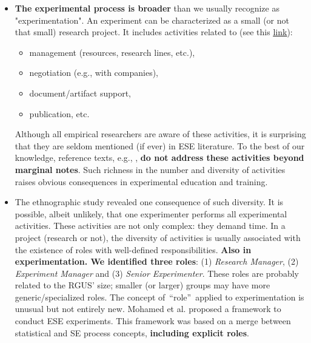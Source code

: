 \begin{itemize}
	\item \textbf{The experimental process is broader} than we usually recognize as "experimentation". An experiment can be characterized as a small (or not that small) research project. It includes activities related to (see this \href{https://zenodo.org/record/7105096#.YyxsxezMLUJ}{\ul{link}}):
	\begin{itemize}
		\item management (resources, research lines, etc.),
		\item negotiation (e.g., with companies), 
		\item document/artifact support, 
		\item publication, etc.
	\end{itemize}
Although all empirical researchers are aware of these activities, it is surprising that they are seldom mentioned (if ever) in ESE literature. To the best of our knowledge, reference texts, e.g., \cite{Wohlin-2000-Experimentation-SE}, \cite{Juristo-2001-SE-experimentation} \textbf{do not address these activities beyond marginal notes}. Such richness in the number and diversity of activities raises obvious consequences in experimental education and training.
	\item The ethnographic study revealed one consequence of such diversity. It is possible, albeit unlikely, that one experimenter performs all experimental activities. These activities are not only complex: they demand time. In a project (research or not), the diversity of activities is usually associated with the existence of roles with well-defined responsibilities. \textbf{Also in experimentation. We identified three roles}: (1) \textit{Research Manager}, (2) \textit{Experiment Manager} and (3) \textit{Senior Experimenter}. These roles are probably related to the RGUS' size; smaller (or larger) groups may have more generic/specialized roles. The concept of~\textquotedblleft role\textquotedblright~applied to experimentation is unusual but not entirely new. Mohamed et al. \cite{Mohamed-1993-roles-ESE} proposed a framework to conduct ESE experiments. This framework was based on a merge between statistical and SE process concepts, \textbf{including explicit roles}.

\end{itemize}
